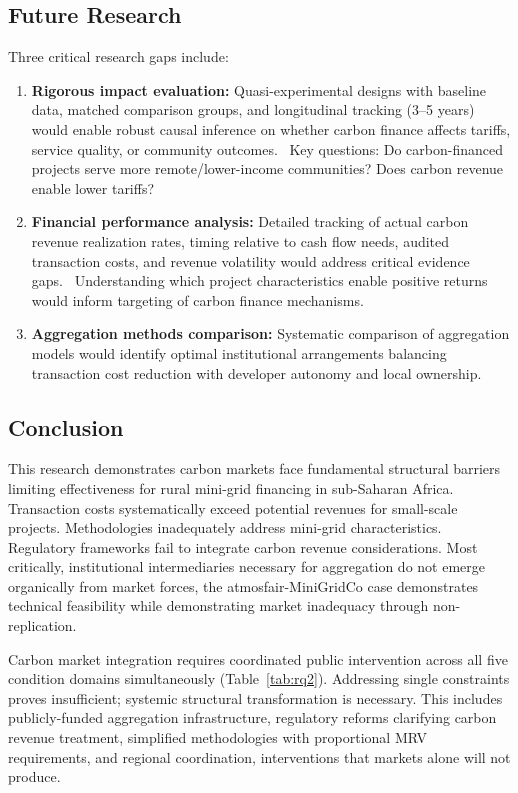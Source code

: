 \subsection{Future Research}
Three critical research gaps include:
\begin{enumerate}
    \item \textbf{Rigorous impact evaluation:} Quasi-experimental designs with baseline data, matched comparison groups, and longitudinal tracking (3--5 years) would enable robust causal inference on whether carbon finance affects tariffs, service quality, or community outcomes.~\cite{duflo} Key questions: Do carbon-financed projects serve more remote/lower-income communities? Does carbon revenue enable lower tariffs?
    \item \textbf{Financial performance analysis:} Detailed tracking of actual carbon revenue realization rates, timing relative to cash flow needs, audited transaction costs, and revenue volatility would address critical evidence gaps.~\cite{bhattacharyya2016} Understanding which project characteristics enable positive returns would inform targeting of carbon finance mechanisms.
    \item \textbf{Aggregation methods comparison:} Systematic comparison of aggregation models would identify optimal institutional arrangements balancing transaction cost reduction with developer autonomy and local ownership.
\end{enumerate}

\subsection{Conclusion}
This research demonstrates carbon markets face fundamental structural barriers limiting effectiveness for rural mini-grid financing in sub-Saharan Africa. Transaction costs systematically exceed potential revenues for small-scale projects. Methodologies inadequately address mini-grid characteristics. Regulatory frameworks fail to integrate carbon revenue considerations. Most critically, institutional intermediaries necessary for aggregation do not emerge organically from market forces, the atmosfair-MiniGridCo case demonstrates technical feasibility while demonstrating market inadequacy through non-replication.

Carbon market integration requires coordinated public intervention across all five condition domains simultaneously (Table~\ref{tab:rq2}). Addressing single constraints proves insufficient; systemic structural transformation is necessary. This includes publicly-funded aggregation infrastructure, regulatory reforms clarifying carbon revenue treatment, simplified methodologies with proportional MRV requirements, and regional coordination, interventions that markets alone will not produce.~\cite{michaelowa2005}


